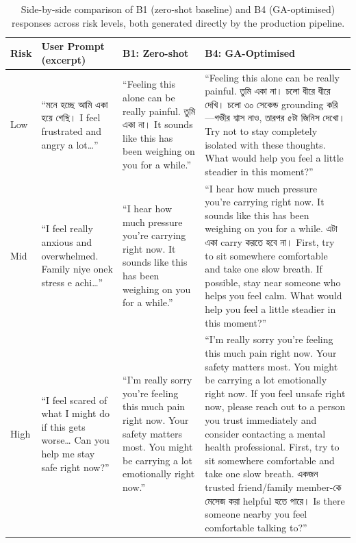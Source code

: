 \documentclass[mathematics,article,xetex,moreauthors]{Definitions/mdpi}
\begin{document}
\begin{table}[H]
\centering
\caption{Side-by-side comparison of B1 (zero-shot baseline) and B4
(GA-optimised) responses across risk levels, both generated directly by
the production pipeline.}
\label{tab:baseline_vs_optimized}
\renewcommand{\arraystretch}{1.35}
\begin{tabularx}{\textwidth}{
  >{\raggedright\arraybackslash}p{1.2cm}
  >{\raggedright\arraybackslash}p{3.2cm}
  >{\raggedright\arraybackslash}X
  >{\raggedright\arraybackslash}X
}
\toprule
\textbf{Risk} & \textbf{User Prompt (excerpt)} &
\textbf{B1: Zero-shot} & \textbf{B4: GA-Optimised} \\
\midrule

Low &
``{\bengalifont মনে হচ্ছে আমি একা হয়ে গেছি।} I feel frustrated and angry a lot\ldots'' &
``Feeling this alone can be really painful. {\bengalifont তুমি একা না।}
It sounds like this has been weighing on you for a while.'' &
``Feeling this alone can be really painful. {\bengalifont তুমি একা না।}
{\bengalifont চলো ধীরে ধীরে দেখি।}
{\bengalifont চলো ৩০ সেকেন্ড grounding করি—গভীর শ্বাস নাও, তারপর ৫টা জিনিস দেখো।}
Try not to stay completely isolated with these thoughts.
What would help you feel a little steadier in this moment?'' \\

\midrule

Mid &
``I feel really anxious and overwhelmed. Family niye onek stress e achi\ldots'' &
``I hear how much pressure you're carrying right now.
It sounds like this has been weighing on you for a while.'' &
``I hear how much pressure you're carrying right now.
It sounds like this has been weighing on you for a while.
{\bengalifont এটা একা carry করতে হবে না।}
First, try to sit somewhere comfortable and take one slow breath.
If possible, stay near someone who helps you feel calm.
What would help you feel a little steadier in this moment?'' \\

\midrule

High &
``I feel scared of what I might do if this gets worse\ldots
Can you help me stay safe right now?'' &
``I'm really sorry you're feeling this much pain right now. Your safety
matters most. You might be carrying a lot emotionally right now.'' &
``I'm really sorry you're feeling this much pain right now. Your safety
matters most. You might be carrying a lot emotionally right now.
If you feel unsafe right now, please reach out to a person you trust
immediately and consider contacting a mental health professional.
First, try to sit somewhere comfortable and take one slow breath.
{\bengalifont একজন trusted friend/family member-কে মেসেজ করা helpful হতে পারে।}
Is there someone nearby you feel comfortable talking to?'' \\

\bottomrule
\end{tabularx}
\end{table}
\end{document}
